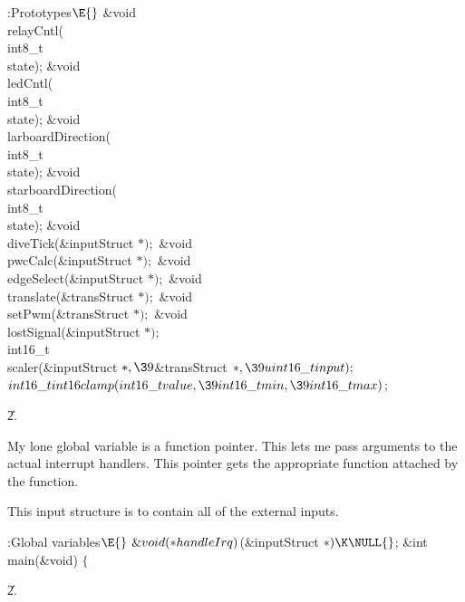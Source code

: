 \B{}:Prototypes\X${}\E{}$\6
\&{void} \\{relayCntl}(\\{int8\_t}\\{state});\6
\&{void} \\{ledCntl}(\\{int8\_t}\\{state});\6
\&{void} \\{larboardDirection}(\\{int8\_t}\\{state});\6
\&{void} \\{starboardDirection}(\\{int8\_t}\\{state});\6
\&{void} \\{diveTick}(\&{inputStruct} ${}{*});{}$\6
\&{void} \\{pwcCalc}(\&{inputStruct} ${}{*});{}$\6
\&{void} \\{edgeSelect}(\&{inputStruct} ${}{*});{}$\6
\&{void} \\{translate}(\&{transStruct} ${}{*});{}$\6
\&{void} \\{setPwm}(\&{transStruct} ${}{*});{}$\6
\&{void} \\{lostSignal}(\&{inputStruct} ${}{*});{}$\7
\\{int16\_t}\\{scaler}(\&{inputStruct} ${}{*},\39{}$\&{transStruct} ${}{*},\39%
\\{uint16\_t}\\{input});{}$\6
${}\\{int16\_t}\\{int16clamp}(\\{int16\_t}\\{value},\39\\{int16\_t}\\{min},\39%
\\{int16\_t}\\{max}){}$;\par
\U2.\fi

My lone global variable is a function pointer.
This lets me pass arguments to the actual interrupt handlers.
This pointer gets the appropriate function attached by the 
function.

This input structure is to contain all of the external inputs.

\Y\B\4:Global variables\X${}\E{}$\6
$\&{void}({*}\\{handleIrq}){}$(\&{inputStruct} ${}{*})\K\NULL{}$;\7
\&{int} \\{main}(\&{void})\1\1\7
$\{{}$\Y\par
\U2.\fi

